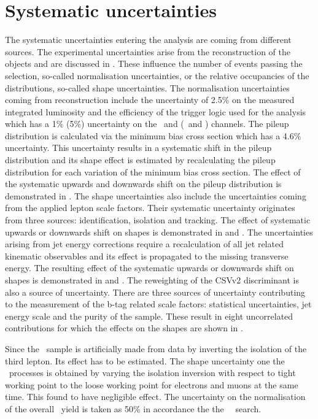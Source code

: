 \section{Systematic uncertainties}
The systematic uncertainties entering the analysis are coming from different sources. The experimental uncertainties arise from the reconstruction of the objects and are discussed in . These influence the number of events passing the selection, so-called normalisation uncertainties, or the relative occupancies of the distributions, so-called shape
 uncertainties. The normalisation uncertainties coming from reconstruction include the uncertainty of 2.5\% on the measured integrated luminosity and the efficiency of the trigger logic used for the analysis which has a 1\% (5\%) uncertainty on the 
 \mumumu\ and \emumu (\eemu\ and \eee) channels. The  pileup distribution is calculated via the minimum bias cross section which has a 4.6\% uncertainty. This uncertainty results in a systematic shift in the pileup distribution and its shape effect is estimated by recalculating the pileup distribution for each variation of the minimum bias cross section. The effect of the systematic upwards and downwards shift on the pileup distribution is demonstrated in . The shape uncertainties also include the uncertainties coming from the applied lepton scale factors. Their systematic uncertainty originates from three sources: identification, isolation and tracking. The effect of systematic upwards or downwards shift on shapes is demonstrated
 in  and . The uncertainties arising from jet energy corrections require a recalculation of all jet related kinematic observables and its effect is propagated to the missing transverse energy. The resulting effect of the systematic upwards or downwards shift on shapes is demonstrated in  and . The reweighting of the CSVv2 discriminant is also a source of uncertainty. There are three sources of uncertainty contributing to the measurement of the b-tag related scale factors: statistical uncertainties, jet energy scale and the purity of the sample. These result in eight uncorrelated contributions for which the effects on the shapes are shown in . 
 
 Since the \NPL\ sample is artificially made from data by inverting the isolation of the third lepton. Its effect has to be estimated. The shape uncertainty one the \NPL\ processes is obtained by varying the isolation inversion with respect to tight working point to the loose working point for electrons and muons at the same time. This found to have negligible effect. The uncertainty on the normalisation of the overall \NPL\ yield is taken as 50\% in accordance the the \SM\ \tZq\ search\todocite.
 
